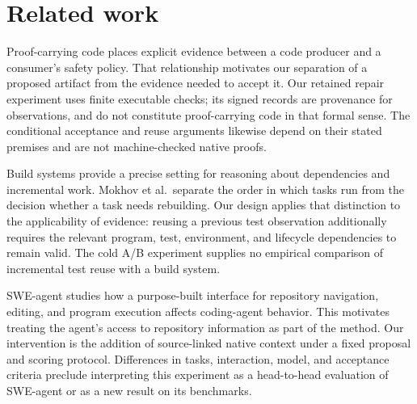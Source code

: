 \section{Related work}

Proof-carrying code places explicit evidence between a code producer and a
consumer's safety policy\citep{baseline01}. That relationship motivates our
separation of a proposed artifact from the evidence needed to accept it. Our
retained repair experiment uses finite executable checks; its signed records
are provenance for observations, and do not constitute proof-carrying code in
that formal sense. The conditional acceptance and reuse arguments likewise
depend on their stated premises and are not machine-checked native proofs.

Build systems provide a precise setting for reasoning about dependencies and
incremental work. Mokhov et al.\ separate the order in which tasks run from the
decision whether a task needs rebuilding\citep{baseline07}. Our design applies
that distinction to the applicability of evidence: reusing a previous test
observation additionally requires the relevant program, test, environment, and
lifecycle dependencies to remain valid. The cold A/B experiment supplies no
empirical comparison of incremental test reuse with a build system.

SWE-agent studies how a purpose-built interface for repository navigation,
editing, and program execution affects coding-agent
behavior\citep{baseline08}. This motivates treating the agent's access to
repository information as part of the method. Our intervention is the addition
of source-linked native context under a fixed proposal and scoring protocol.
Differences in tasks, interaction, model, and acceptance criteria preclude
interpreting this experiment as a head-to-head evaluation of SWE-agent or as a
new result on its benchmarks.
